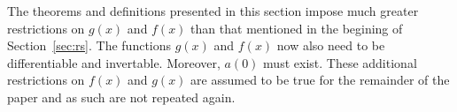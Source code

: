 \documentclass[twoside,reqno,11pt]{fcaa-var} %
\begin{document}
\noindent
The theorems and definitions presented in this section impose much greater restrictions on $g(x)$ and $f(x)$ than that mentioned in the begining of Section~\ref{sec:rs}. The functions $g(x)$ and $f(x)$ now also need to be differentiable and invertable. Moreover, $a(0)$ must exist. These additional restrictions on $f(x)$ and $g(x)$ are assumed to be true for the remainder of the paper and as such are not repeated again. 


% 
% 
% 
\end{document}
